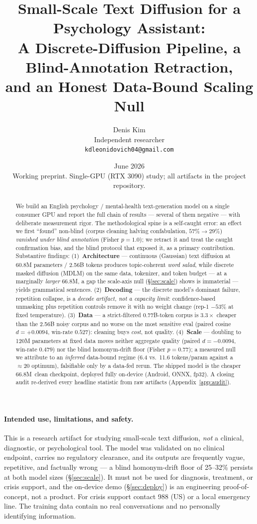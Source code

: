 \documentclass[11pt]{article}
\title{\bfseries Small-Scale Text Diffusion for a Psychology Assistant:\\
A Discrete-Diffusion Pipeline, a Blind-Annotation Retraction,\\
and an Honest Data-Bound Scaling Null}
\author{Denis Kim\\
\small Independent researcher\\
\small \texttt{kdleonidovich04@gmail.com}}
\date{June 2026\\[2pt]\small Working preprint. Single-GPU (RTX 3090) study; all artifacts in the project repository.}
\newcommand{\sixsix}{66.8M}
\begin{document}
\maketitle

\begin{abstract}
We build an English psychology / mental-health text-generation model on a single consumer GPU and report the full chain of results --- several of them negative --- with deliberate measurement rigor. The methodological spine is a self-caught error: an effect we first ``found'' non-blind (corpus cleaning halving confabulation, $57\%\!\to\!29\%$) \emph{vanished under blind annotation} (Fisher $p=1.0$); we retract it and treat the caught confirmation bias, and the blind protocol that exposed it, as a primary contribution. Substantive findings: (1)~\textbf{Architecture} --- continuous (Gaussian) text diffusion at 60.8M parameters / 2.56B tokens produces topic-coherent \emph{word salad}, while discrete masked diffusion (MDLM) on the same data, tokenizer, and token budget --- at a marginally \emph{larger} 66.8M, a gap the scale-axis null (\S\ref{sec:scale}) shows is immaterial --- yields grammatical sentences. (2)~\textbf{Decoding} --- the discrete model's dominant failure, repetition collapse, is a \emph{decode artifact, not a capacity limit}: confidence-based unmasking plus repetition controls remove it with no weight change (rep-1 $-53\%$ at fixed temperature). (3)~\textbf{Data} --- a strict-filtered 0.77B-token corpus is $3.3\times$ cheaper than the 2.56B noisy corpus and no worse on the most sensitive eval (paired cosine $d=+0.0094$, win-rate $0.527$): cleaning buys \emph{cost}, not quality. (4)~\textbf{Scale} --- doubling to 120M parameters at fixed data moves neither aggregate quality (paired $d=-0.0094$, win-rate $0.479$) nor the blind homonym-drift floor (Fisher $p=0.77$); a measured null we attribute to an \emph{inferred} data-bound regime (6.4 vs.\ 11.6 tokens/param against a $\approx$20 optimum), falsifiable only by a data-fed rerun. The shipped model is the cheaper \sixsix\ clean checkpoint, deployed fully on-device (Android, ONNX, fp32). A closing audit re-derived every headline statistic from raw artifacts (Appendix~\ref{app:audit}).
\end{abstract}

\paragraph{Intended use, limitations, and safety.} This is a research artifact for studying small-scale text diffusion, \emph{not} a clinical, diagnostic, or psychological tool. The model was validated on no clinical endpoint, carries no regulatory clearance, and its outputs are frequently vague, repetitive, and factually wrong --- a blind homonym-drift floor of 25--32\% persists at both model sizes (\S\ref{sec:scale}). It must not be used for diagnosis, treatment, or crisis support, and the on-device demo (\S\ref{sec:deploy}) is an engineering proof-of-concept, not a product. For crisis support contact 988 (US) or a local emergency line. The training data contain no real conversations and no personally identifying information.
\end{document}
